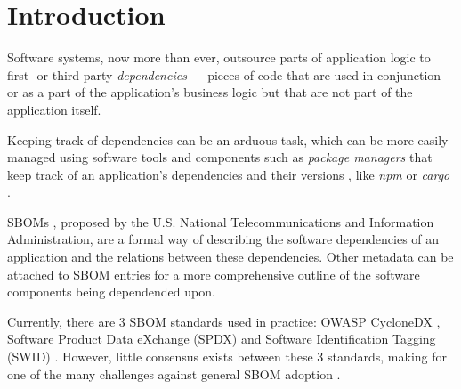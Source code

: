 \section{Introduction}

Software systems, now more than ever, outsource parts of application logic to first- or third-party \emph{dependencies} --- pieces of code that are used in conjunction or as a part of the application's business logic but that are not part of the application itself. \needsRef

Keeping track of dependencies can be an arduous task, which can be more easily managed using software tools and components such as \emph{package managers} that keep track of an application's dependencies and their versions \needsRef, like \emph{npm} or \emph{cargo} \cite{tools:pkg-mngr:npm,tools:pkg-mngr:cargo}.

SBOMs \cite{article:concept:sbom-2}, proposed by the U.S. National Telecommunications and Information Administration, are a formal way of describing the software dependencies of an application and the relations between these dependencies. Other metadata can be attached to SBOM entries for a more comprehensive outline of the software components being dependended upon.

Currently, there are 3 SBOM standards used in practice: OWASP CycloneDX \cite{standards:sbom:cyclonedx}, Software Product Data eXchange (SPDX) \cite{standards:sbom:spdx} and Software Identification Tagging (SWID) \cite{standards:sbom:swid}. However, little consensus exists between these 3 standards, making for one of the many challenges against general SBOM adoption \cite{article:sbom-study}.

